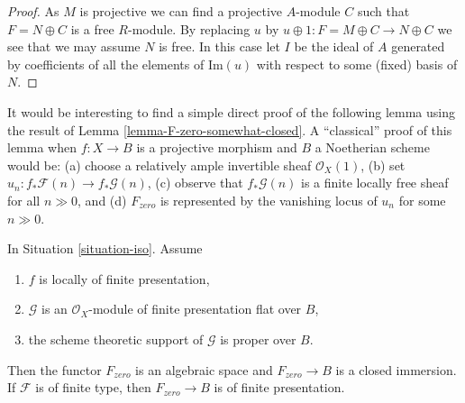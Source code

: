 \begin{proof}
As $M$ is projective we can find a projective $A$-module $C$
such that $F = N \oplus C$ is a free $R$-module.
By replacing $u$ by $u \oplus 1 : F = M \oplus C \to N \oplus C$
we see that we may assume $N$ is free. In this case let $I$ be
the ideal of $A$ generated by coefficients of all the elements of
$\text{Im}(u)$ with respect to some (fixed) basis of $N$.
\end{proof}

\noindent
It would be interesting to find a simple direct proof of the following
lemma using the result of Lemma \ref{lemma-F-zero-somewhat-closed}.
A ``classical'' proof of this lemma when $f : X \to B$ is a projective
morphism and $B$ a Noetherian scheme would be: (a) choose a relatively ample
invertible sheaf $\mathcal{O}_X(1)$, (b) set
$u_n : f_*\mathcal{F}(n) \to f_*\mathcal{G}(n)$,
(c) observe that $f_*\mathcal{G}(n)$ is a finite locally free sheaf
for all $n \gg 0$, and (d) $F_{zero}$ is represented by the vanishing
locus of $u_n$ for some $n \gg 0$.

\begin{lemma}
\label{lemma-F-zero-closed}
In Situation \ref{situation-iso}. Assume
\begin{enumerate}
\item $f$ is locally of finite presentation,
\item $\mathcal{G}$ is an $\mathcal{O}_X$-module of finite presentation
flat over $B$,
\item the scheme theoretic support of $\mathcal{G}$ is proper over $B$.
\end{enumerate}
Then the functor $F_{zero}$ is an algebraic space and $F_{zero} \to B$
is a closed immersion. If $\mathcal{F}$ is of finite type, then
$F_{zero} \to B$ is of finite presentation.
\end{lemma}

